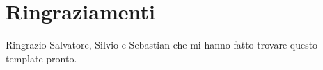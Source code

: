 \documentclass[12pt,a4paper,italian,twoside, openany]{book}
\begin{document}


\setlength{\parskip}{\bigskipamount}
\renewcommand{\baselinestretch}{1.4}\normalsize


\renewcommand{\baselinestretch}{1}\normalsize


\frontmatter 						%
\tableofcontents

\pagestyle{plain}

\renewcommand{\baselinestretch}{1.4}\normalsize

\mainmatter







\pagestyle{empty}

\chapter*{Ringraziamenti}
Ringrazio Salvatore, Silvio e Sebastian che mi hanno fatto trovare questo template pronto.


%




\nocite{*}



\cleardoublepage
\listoffigures
\listoftables

\cleardoublepage
\end{document}
